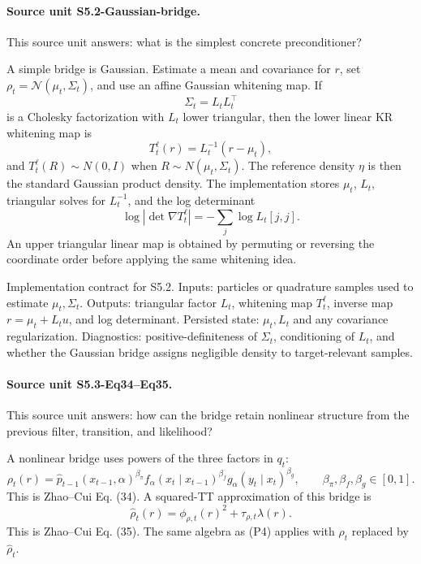 \documentclass[11pt]{article}
\begin{document}
\paragraph{Source unit S5.2-Gaussian-bridge.}
This source unit answers: what is the simplest concrete preconditioner?

A simple bridge is Gaussian.  Estimate a mean and covariance for \(r\), set
\(\rho_t=\mathcal N(\mu_t,\Sigma_t)\), and use an affine Gaussian whitening map.
If
\[
    \Sigma_t=L_tL_t^\top
    \tag{P6a}
\]
is a Cholesky factorization with \(L_t\) lower triangular, then the lower
linear KR whitening map is
\[
    T_t^{\ell}(r)
    =
    L_t^{-1}(r-\mu_t),
    \tag{P6b}
\]
and \(T_t^{\ell}(R)\sim N(0,I)\) when \(R\sim N(\mu_t,\Sigma_t)\).  The
reference density \(\eta\) is then the standard Gaussian product density.  The
implementation stores \(\mu_t\), \(L_t\), triangular solves for \(L_t^{-1}\),
and the log determinant
\[
    \log|\det\nabla T_t^{\ell}|
    =
    -\sum_j\log L_t[j,j].
    \tag{P6c}
\]
An upper triangular linear map is obtained by permuting or reversing the
coordinate order before applying the same whitening idea.

Implementation contract for S5.2.  Inputs: particles or quadrature samples used
to estimate \(\mu_t,\Sigma_t\).  Outputs: triangular factor \(L_t\), whitening
map \(T_t^\ell\), inverse map \(r=\mu_t+L_tu\), and log determinant.  Persisted
state: \(\mu_t,L_t\) and any covariance regularization.  Diagnostics:
positive-definiteness of \(\Sigma_t\), conditioning of \(L_t\), and whether the
Gaussian bridge assigns negligible density to target-relevant samples.

\paragraph{Source unit S5.3-Eq34--Eq35.}
This source unit answers: how can the bridge retain nonlinear structure from
the previous filter, transition, and likelihood?

A nonlinear bridge uses powers of the three factors in \(q_t\):
\[
    \rho_t(r)
    =
    \widehat p_{t-1}(x_{t-1},\alpha)^{\beta_\pi}
    f_\alpha(x_t\mid x_{t-1})^{\beta_f}
    g_\alpha(y_t\mid x_t)^{\beta_g},
    \qquad
    \beta_\pi,\beta_f,\beta_g\in[0,1].
    \tag{P6}
\]
This is Zhao--Cui Eq. (34).  A squared-TT approximation of this bridge is
\[
    \widehat\rho_t(r)
    =
    \phi_{\rho,t}(r)^2+\tau_{\rho,t}\lambda(r).
    \tag{P7}
\]
This is Zhao--Cui Eq. (35).  The same algebra as (P4) applies with
\(\rho_t\) replaced by \(\widehat\rho_t\).
\end{document}
